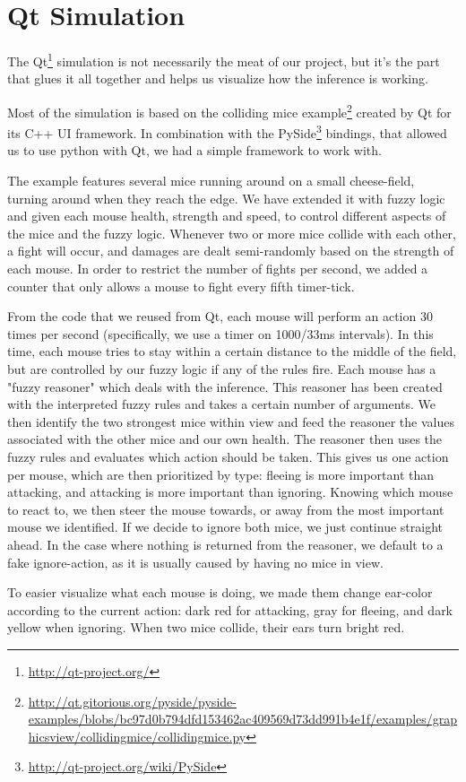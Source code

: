 \section{Qt Simulation}\label{qt simulation}
The Qt\footnote{\url{http://qt-project.org/}} simulation is not necessarily the
meat of our project, but it's the part that glues it all together and helps us
visualize how the inference is working.

Most of the simulation is based on the colliding mice example\footnote{\url{http://qt.gitorious.org/pyside/pyside-examples/blobs/bc97d0b794dfd153462ac409569d73dd991b4e1f/examples/graphicsview/collidingmice/collidingmice.py}}
created by Qt for its C++ UI framework. In combination with the PySide\footnote{\url{http://qt-project.org/wiki/PySide}}
bindings, that allowed us to use python with Qt, we had a simple framework to work with.

The example features several mice running around on a small cheese-field, turning around when they
reach the edge. We have extended it with fuzzy logic and given each mouse health, strength and speed,
to control different aspects of the mice and the fuzzy logic. Whenever two or more mice collide with each
other, a fight will occur, and damages are dealt semi-randomly based on the strength of each mouse.
In order to restrict the number of fights per second, we added a counter that only allows a mouse to fight
every fifth timer-tick.

From the code that we reused from Qt, each mouse will perform an action 30 times per
second (specifically, we use a timer on 1000/33ms intervals). In this time, each mouse tries to stay within
a certain distance to the middle of the field, but are controlled by our fuzzy logic if any of the rules fire.
Each mouse has a "fuzzy reasoner" which deals with the inference. This reasoner has been created
with the interpreted fuzzy rules and takes a certain number of arguments. We then
identify the two strongest mice within view and feed the reasoner the values associated
with the other mice and our own health. The reasoner then uses the fuzzy rules and
evaluates which action should be taken. This gives us one action per mouse, 
which are then prioritized by type: fleeing is more important than attacking,
and attacking is more important than ignoring. Knowing which mouse to react to, we
then steer the mouse towards, or away from the most important mouse we identified.
If we decide to ignore both mice, we just continue straight ahead. In the case where nothing
is returned from the reasoner, we default to a fake ignore-action, as it is usually
caused by having no mice in view.

To easier visualize what each mouse is doing, we made them change ear-color according to the current action:
dark red for attacking, gray for fleeing, and dark yellow when ignoring. When two mice collide, their ears
turn bright red.